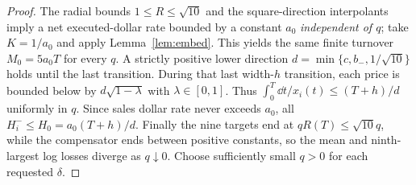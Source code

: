 \documentclass[review,hidelinks,onefignum,onetabnum]{siamonline250211}%
\begin{document}
\begin{proof}
The radial bounds $1\le R\le\sqrt{10}$ and the square-direction
interpolants imply a net executed-dollar rate bounded by a constant
$a_0$ \emph{independent of $q$}; take $K=1/a_0$ and apply
Lemma~\ref{lem:embed}. This yields the same finite turnover
$M_0=5a_0T$ for every $q$. A strictly positive lower direction
$d=\min\{c,b_-,1/\sqrt{10}\}$ holds until the last transition.
During that last width-$h$ transition, each price is bounded below
by $d\sqrt{1-\lambda}$ with $\lambda\in[0,1]$.
Thus $\int_0^T\dd t/x_i(t)\le(T+h)/d$ uniformly in $q$.
Since sales dollar rate never exceeds $a_0$, all
$H_i^-\le H_0=a_0(T+h)/d$.
Finally the nine targets end at $qR(T)\le\sqrt{10}q$, while the
compensator ends between positive constants, so the mean and
ninth-largest log losses diverge as $q\downarrow0$.
Choose sufficiently small $q>0$ for each requested $\delta$.
\end{proof}
\end{document}
